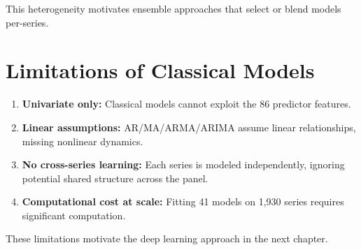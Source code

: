 This heterogeneity motivates ensemble approaches that select or blend models per-series.

\section{Limitations of Classical Models}

\begin{enumerate}
    \item \textbf{Univariate only:} Classical models cannot exploit the 86 predictor features.
    \item \textbf{Linear assumptions:} AR/MA/ARMA/ARIMA assume linear relationships, missing nonlinear dynamics.
    \item \textbf{No cross-series learning:} Each series is modeled independently, ignoring potential shared structure across the panel.
    \item \textbf{Computational cost at scale:} Fitting 41 models on 1,930 series requires significant computation.
\end{enumerate}

These limitations motivate the deep learning approach in the next chapter.
